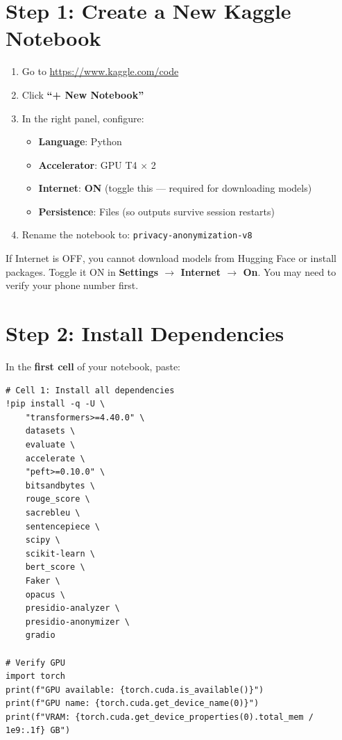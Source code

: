 \documentclass[11pt, a4paper]{article}
\begin{document}
\section{Step 1: Create a New Kaggle Notebook}

\begin{step}[Instructions]
\begin{enumerate}
    \item Go to \url{https://www.kaggle.com/code}
    \item Click \textbf{``+ New Notebook''}
    \item In the right panel, configure:
    \begin{itemize}
        \item \textbf{Language}: Python
        \item \textbf{Accelerator}: GPU T4 $\times$ 2
        \item \textbf{Internet}: \textbf{ON} (toggle this --- required for downloading models)
        \item \textbf{Persistence}: Files (so outputs survive session restarts)
    \end{itemize}
    \item Rename the notebook to: \texttt{privacy-anonymization-v8}
\end{enumerate}
\end{step}

\begin{important}
If Internet is OFF, you cannot download models from Hugging Face or install packages. Toggle it ON in \textbf{Settings $\rightarrow$ Internet $\rightarrow$ On}. You may need to verify your phone number first.
\end{important}

\section{Step 2: Install Dependencies}

In the \textbf{first cell} of your notebook, paste:

\begin{lstlisting}[style=bash]
# Cell 1: Install all dependencies
!pip install -q -U \
    "transformers>=4.40.0" \
    datasets \
    evaluate \
    accelerate \
    "peft>=0.10.0" \
    bitsandbytes \
    rouge_score \
    sacrebleu \
    sentencepiece \
    scipy \
    scikit-learn \
    bert_score \
    Faker \
    opacus \
    presidio-analyzer \
    presidio-anonymizer \
    gradio

# Verify GPU
import torch
print(f"GPU available: {torch.cuda.is_available()}")
print(f"GPU name: {torch.cuda.get_device_name(0)}")
print(f"VRAM: {torch.cuda.get_device_properties(0).total_mem / 1e9:.1f} GB")
\end{lstlisting}
\end{document}
